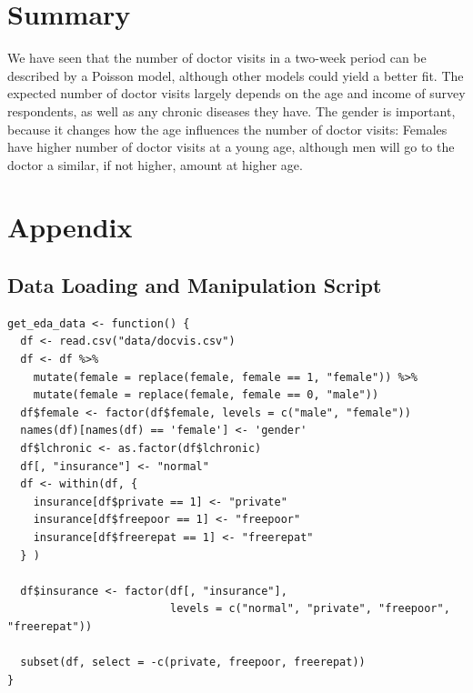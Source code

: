 \documentclass[a4paper,11pt]{article}
\begin{document}
\section{Summary}
We have seen that the number of doctor visits in a two-week period can be described by a Poisson model, although other models could yield a better fit. The expected number of doctor visits largely depends on the age  and income of survey respondents, as well as any chronic diseases they have. The gender is important, because it changes how the age influences the number of doctor visits: Females have higher number of doctor visits at a young age, although men will go to the doctor a similar, if not higher, amount at higher age.




\newpage

\section{Appendix}
\subsection{Data Loading and Manipulation Script}
\begin{verbatim}
get_eda_data <- function() {
  df <- read.csv("data/docvis.csv")
  df <- df %>%
    mutate(female = replace(female, female == 1, "female")) %>%
    mutate(female = replace(female, female == 0, "male"))
  df$female <- factor(df$female, levels = c("male", "female"))
  names(df)[names(df) == 'female'] <- 'gender'
  df$lchronic <- as.factor(df$lchronic)
  df[, "insurance"] <- "normal"
  df <- within(df, {
    insurance[df$private == 1] <- "private"
    insurance[df$freepoor == 1] <- "freepoor"
    insurance[df$freerepat == 1] <- "freerepat"
  } )

  df$insurance <- factor(df[, "insurance"],
                         levels = c("normal", "private", "freepoor", "freerepat"))

  subset(df, select = -c(private, freepoor, freerepat))
}
\end{verbatim}
\end{document}
